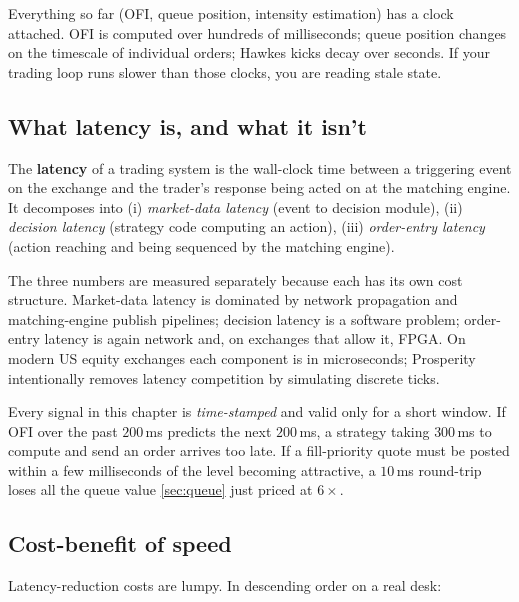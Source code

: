 Everything so far (OFI, queue position, intensity estimation)
has a clock attached. OFI is computed over hundreds of
milliseconds; queue position changes on the timescale of
individual orders; Hawkes kicks decay over seconds. If your
trading loop runs slower than those clocks, you are reading
stale state.

\subsection{What latency is, and what it isn't}

\begin{definition}[Latency]
\label{def:latency}
The \textbf{latency} of a trading system is the wall-clock time
between a triggering event on the exchange and the trader's
response being acted on at the matching engine. It decomposes
into (i) \emph{market-data latency} (event to decision module),
(ii) \emph{decision latency} (strategy code computing an action),
(iii) \emph{order-entry latency} (action reaching and being
sequenced by the matching engine).
\end{definition}

The three numbers are measured separately because each has its
own cost structure. Market-data latency is dominated by network
propagation and matching-engine publish pipelines; decision
latency is a software problem; order-entry latency is again
network and, on exchanges that allow it, FPGA. On modern US
equity exchanges each component is in microseconds; Prosperity
intentionally removes latency competition by simulating
discrete ticks.

Every signal in this chapter is \emph{time-stamped} and valid
only for a short window. If OFI over the past $200$\,ms predicts
the next $200$\,ms, a strategy taking $300$\,ms to compute and
send an order arrives too late. If a fill-priority quote must
be posted within a few milliseconds of the level becoming
attractive, a $10$\,ms round-trip loses all the queue value
\cref{sec:queue} just priced at $6\times$.

\subsection{Cost-benefit of speed}

Latency-reduction costs are lumpy. In descending order on a real
desk:

